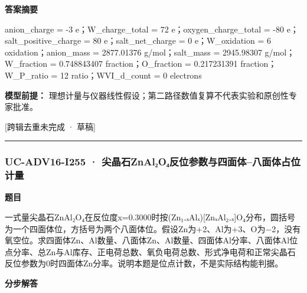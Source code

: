 \documentclass[UTF8,11pt,a4paper]{ctexart}
\begin{document}
\noindent\textbf{答案摘要}\par
anion\_charge = -3 e；W\_charge\_total = 72 e；oxygen\_charge\_total = -80 e；salt\_positive\_charge = 80 e；salt\_net\_charge = 0 e；W\_oxidation = 6 oxidation；anion\_mass = 2877.01376 g/mol；salt\_mass = 2945.98307 g/mol；W\_fraction = 0.748843407 fraction；O\_fraction = 0.217231391 fraction；W\_P\_ratio = 12 ratio；WVI\_d\_count = 0 electrons\par
\noindent\textbf{模型前提：}
理想计量与仪器线性假设；第二路径数值复算不代表实验和原创性专家批准。\par
\noindent\textcolor{red!65!black}{[跨辑去重未完成 · 草稿]} \par
\medskip\hrule\medskip
{}
\subsubsection*{UC-ADV16-I255 · 尖晶石ZnAl₂O₄反位参数与四面体–八面体占位计量}
\noindent\textbf{题目}\par
一式量尖晶石ZnAl₂O₄在反位度x=0.3000时按(Zn₁₋ₓAlₓ)[ZnₓAl₂₋ₓ]O₄分布，圆括号为一个四面体位，方括号为两个八面体位。假设Zn为+2、Al为+3、O为−2，没有氧空位。求四面体Zn、Al数量、八面体Zn、Al数量、四面体Al分率、八面体Al位点分率、总Zn与Al库存、正电荷总数、氧负电荷总数、形式净电荷和正常尖晶石反位参数为0时四面体Zn分率。说明本题是位点计数，不是实际结构能判据。\par
\medskip\noindent\textbf{分步解答}
\end{document}
